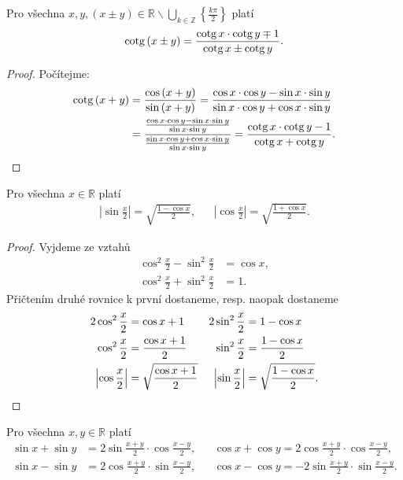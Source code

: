 \begin{veta}
  Pro všechna $x,y,(x\pm y)\in\mathbb{R}\smallsetminus\bigcup\limits_{k\in\mathbb{Z}} \left\{\frac{k\pi}{2}\right\}$ platí
  $$\operatorname{cotg}\left(x\pm y\right) = \frac{\operatorname{cotg} x \cdot \operatorname{cotg} y \mp 1}{\operatorname{cotg} x \pm \operatorname{cotg} y}.$$
\end{veta}

\begin{proof}
    Počítejme:
    \begin{align*}
        \operatorname{cotg} \left(x+y\right) & = \frac{\cos \left(x+y\right)}{\sin \left(x+y\right)}=\frac{\cos x \cdot \cos y - \sin x\cdot  \sin y}{\sin x\cdot  \cos y + \cos x\cdot  \sin y}\\
       &  = \frac{\frac{\cos x\cdot  \cos y - \sin x \cdot \sin y}{\sin x \cdot \sin y}}{\frac{\sin x \cdot \cos y + \cos x\cdot  \sin y}{\sin x\cdot  \sin y}}=\frac{\operatorname{cotg} x \cdot \operatorname{cotg} y-1}{\operatorname{cotg} x + \operatorname{cotg} y}.\qedhere
    \end{align*}
\end{proof}

\begin{veta}
    Pro všechna $x \in \mathbb{R}$ platí
    \begin{align*}
        \left| \sin \frac{x}{2} \right| = \sqrt{\frac{1-\cos x}{2}}, & & \left| \cos \frac{x}{2}\right| = \sqrt{\frac{1+\cos x}{2}}.
    \end{align*}
\end{veta}

\begin{proof}
  Vyjdeme ze vztahů
  \begin{align*}
  \cos^2 \frac{x}{2} - \sin^2 \frac{x}{2} &= \cos x,\\
  \cos^2 \frac{x}{2} + \sin^2 \frac{x}{2} &=1.
  \end{align*}
  Přičtením druhé rovnice k první dostaneme, resp. naopak dostaneme
  \begin{align*}
    2\cos^2 \frac{x}{2}&=\cos x +1 & 2\sin^2 \frac{x}{2} & =1-\cos x \\
    \cos^2 \frac{x}{2}&=\frac{\cos x +1}{2} & \sin^2 \frac{x}{2} & =\frac{1-\cos x }{2} \\
    \left| \cos \frac{x}{2} \right| &= \sqrt{\frac{\cos x +1}{2}} & \left| \sin \frac{x}{2} \right | & = \sqrt{\frac{1-\cos x}{2}}.\qedhere
  \end{align*}
\end{proof}

\begin{veta}
  Pro všechna $ x,y \in \mathbb{R}$ platí
  \begin{align*}
    \sin x + \sin y &= 2\sin \frac{x+y}{2}\cdot \cos \frac{x-y}{2},& & \cos x + \cos y = 2 \cos \frac{x + y}{2}\cdot \cos \frac{x - y}{2},\\
    \sin x - \sin y &= 2\cos \frac{x + y}{2}\cdot \sin \frac{x - y}{2},& & \cos x - \cos y =-2\sin \frac{x + y}{2}\cdot \sin \frac{x -y}{2}.
  \end{align*}
\end{veta}


